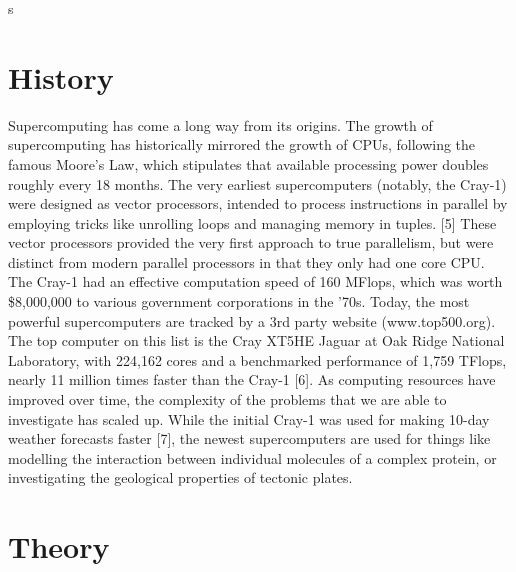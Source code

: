 s\documentclass[10pt]{article}
\begin{document}
\section{History}
Supercomputing has come a long way from its origins. The growth of supercomputing has historically mirrored the growth of CPUs, following the famous Moore's Law, which stipulates that available processing power doubles roughly every 18 months. The very earliest supercomputers (notably, the Cray-1) were designed as vector processors, intended to process instructions in parallel by employing tricks like unrolling loops and managing memory in tuples. [5] These vector processors provided the very first approach to true parallelism, but were distinct from modern parallel processors in that they only had one core CPU. The Cray-1 had an effective computation speed of 160 MFlops, which was worth \$8,000,000 to various government corporations in the '70s. Today, the most powerful supercomputers are tracked by a 3rd party website (www.top500.org). The top computer on this list is the Cray XT5HE Jaguar at Oak Ridge National Laboratory, with 224,162 cores and a benchmarked performance of 1,759 TFlops, nearly 11 million times faster than the Cray-1 [6]. As computing resources have improved over time, the complexity of the problems that we are able to investigate has scaled up. While the initial Cray-1 was used for making 10-day weather forecasts faster [7], the newest supercomputers are used for things like modelling the interaction between individual molecules of a complex protein, or investigating the geological properties of tectonic plates. 


\section{Theory}
\end{document}
